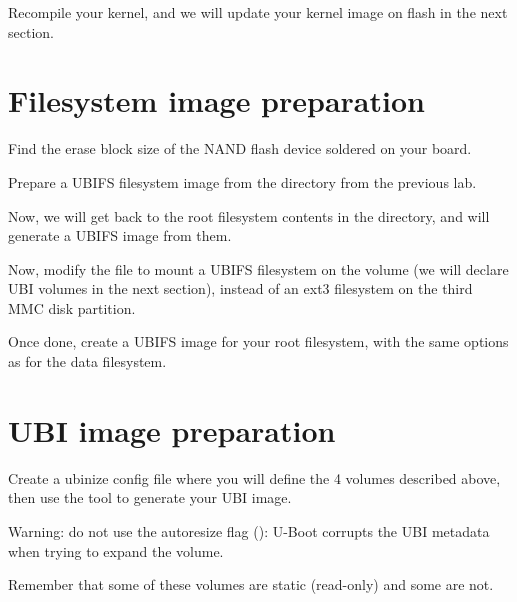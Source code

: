 Recompile your kernel, and we will update your kernel image on flash
in the next section.

\section{Filesystem image preparation}

Find the erase block size of the NAND flash device soldered on your
board.

Prepare a UBIFS filesystem image from the 
directory from the previous lab.

Now, we will get back to the root filesystem contents in the
 directory, and will generate a UBIFS image from them.

Now, modify the  file to mount a UBIFS filesystem
on the  volume (we will declare UBI volumes in the next
section), instead of an ext3 filesystem on the third MMC disk partition.

Once done, create a UBIFS image for your root filesystem, with the same
options as for the data filesystem.

\section{UBI image preparation}

Create a ubinize config file where you will define the 4 volumes
described above, then use the  tool to generate your
UBI image.

Warning: do not use the autoresize flag ():
U-Boot corrupts the UBI metadata when trying to expand the volume.

Remember that some of these volumes are static (read-only) and some are
not.

%
%

%
%
%
%
%
%

